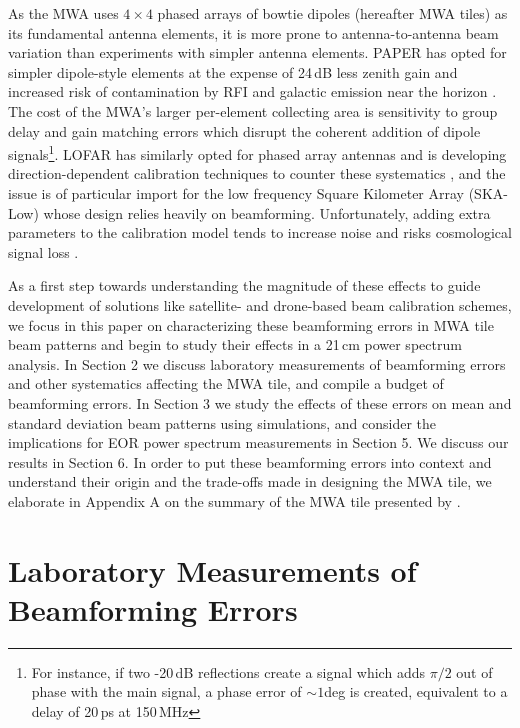 As the MWA uses $4\times4$ phased arrays of bowtie dipoles (hereafter MWA tiles) as its fundamental antenna elements, it is more prone to antenna-to-antenna beam variation than experiments with simpler antenna elements. PAPER has opted for simpler dipole-style elements at the expense of 24\,dB less zenith gain and increased risk of contamination by RFI and galactic emission near the horizon \citep{nithya15}. The cost of the MWA's larger per-element collecting area is sensitivity to group delay and gain matching errors which disrupt the coherent addition of dipole signals\footnote{For instance, if two -20\,dB reflections create a signal which adds $\pi/2$ out of phase with the main signal, a phase error of  $\sim1$deg is created, equivalent to a delay of 20\,ps at 150\,MHz}. LOFAR has similarly opted for phased array antennas and is developing direction-dependent calibration techniques to counter these systematics \citep{lofareorpaper}, and the issue is of particular import for the low frequency Square Kilometer Array (SKA-Low) \citep{ska1,ska2,ska3} whose design relies heavily on beamforming. Unfortunately, adding extra parameters to the calibration model tends to increase noise and risks cosmological signal loss \citep[e.g.,][]{gmrtsignalloss}.

As a first step towards understanding the magnitude of these effects to guide development of solutions like satellite- and drone-based beam calibration schemes, we focus in this paper on characterizing these beamforming errors in MWA tile beam patterns and begin to study their effects in a 21\,cm power spectrum analysis. In Section 2 we discuss laboratory measurements of beamforming errors and other systematics affecting the MWA tile, and compile a budget of beamforming errors. In Section 3 we study the effects of these errors on mean and standard deviation beam patterns using simulations, and consider the implications for EOR power spectrum measurements in Section 5. We discuss our results in Section 6. In order to put these beamforming errors into context and understand their origin and the trade-offs made in designing the MWA tile, we elaborate in Appendix A on the summary of the MWA tile presented by \citet{tingay13}.

\section{Laboratory Measurements of Beamforming Errors}
\label{sec:measurements}

